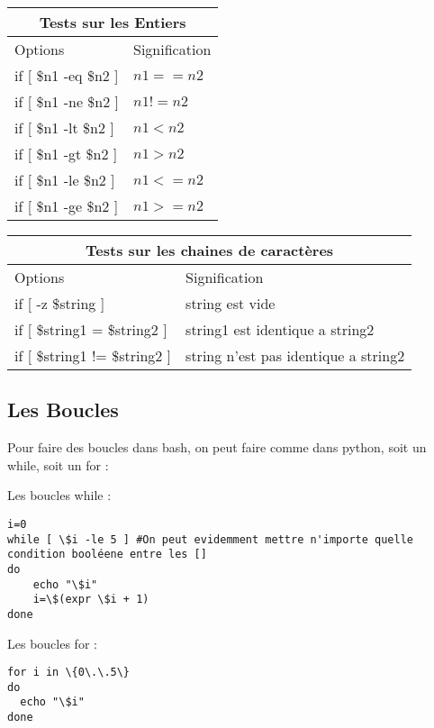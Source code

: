 \documentclass{article}
\begin{document}
\medskip

\begin{tabular}{ |p{4cm}||p{4cm}| }
 \hline
 \multicolumn{2}{|c|}{Tests sur les Entiers} \\
 \hline
  Options & Signification \\
 \hline
  if [ \$n1 -eq \$n2 ] & $n1 == n2$\\
 \hline
  if [ \$n1 -ne \$n2 ] & $n1 != n2$\\
 \hline
  if [ \$n1 -lt \$n2 ] & $n1 < n2$\\
 \hline
  if [ \$n1 -gt \$n2 ] & $n1 > n2$\\
 \hline
  if [ \$n1 -le \$n2 ] & $n1 <= n2$\\
 \hline
  if [ \$n1 -ge \$n2 ] & $n1 >= n2$\\
 \hline
\end{tabular}

\medskip

\begin{tabular}{ |p{4cm}||p{4cm}| }
 \hline
 \multicolumn{2}{|c|}{Tests sur les chaines de caractères} \\
 \hline
  Options & Signification \\
 \hline
  if [ -z \$string ] & string est vide\\
 \hline
  if [ \$string1 = \$string2 ] & string1 est identique a string2\\
 \hline
  if [ \$string1 != \$string2 ] & string n'est pas identique a string2\\
 \hline
\end{tabular}

\subsection{Les Boucles}

Pour faire des boucles dans bash, on peut faire comme dans python, soit un while, soit un for :

Les boucles while :

\begin{verbatim}
i=0
while [ \$i -le 5 ] #On peut evidemment mettre n'importe quelle condition booléene entre les []
do
    echo "\$i"
    i=\$(expr \$i + 1)
done
\end{verbatim}

Les boucles for :

\begin{verbatim}
for i in \{0\.\.5\}
do
  echo "\$i"
done
\end{verbatim}
\end{document}
